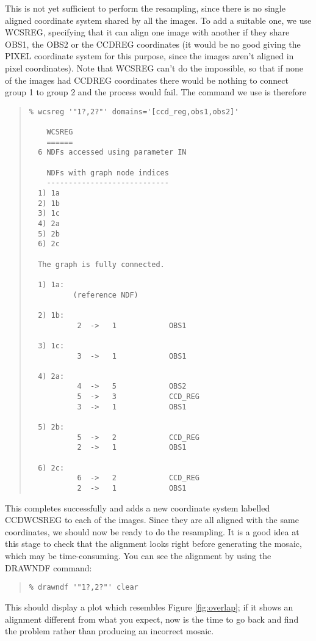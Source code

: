 \documentclass[twoside,11pt]{article}
\newcommand{\hyperref}[4]{#2\ref{#4}#3}
\newcommand{\htmlref}[2]{#1}
\renewcommand{\_}{\texttt{\symbol{95}}}
\newenvironment{myquote}{\begin{quote}\begin{small}}{\end{small}\end{quote}}
\newcommand{\routine}[1]{{\sc #1}}
\newcommand{\xroutine}[1]{\htmlref{{\sc #1}}{#1}}
\begin{document}
This is not yet sufficient to perform the resampling,
since there is no single aligned coordinate system shared by all the images.
To add a suitable one, we use \xroutine{WCSREG},
specifying that it can align one image with another if they share
OBS1, the OBS2 or the CCD\_REG coordinates (it would be no good
giving the PIXEL coordinate system for this purpose, since the images aren't
aligned in pixel coordinates).
Note that \routine{WCSREG} can't do the impossible, so that if
none of the images had CCD\_REG coordinates there would be nothing
to connect group 1 to group 2 and the process would fail.
The command we use is therefore
\begin{myquote}
\begin{verbatim}
% wcsreg '"1?,2?"' domains='[ccd_reg,obs1,obs2]'

    WCSREG
    ======
  6 NDFs accessed using parameter IN

    NDFs with graph node indices
    ----------------------------
  1) 1a
  2) 1b
  3) 1c
  4) 2a
  5) 2b
  6) 2c

  The graph is fully connected.

  1) 1a:
          (reference NDF)

  2) 1b:
           2  ->   1            OBS1

  3) 1c:
           3  ->   1            OBS1

  4) 2a:
           4  ->   5            OBS2
           5  ->   3            CCD_REG
           3  ->   1            OBS1

  5) 2b:
           5  ->   2            CCD_REG
           2  ->   1            OBS1

  6) 2c:
           6  ->   2            CCD_REG
           2  ->   1            OBS1
\end{verbatim}
\end{myquote}
This completes successfully and adds a new coordinate system
labelled CCD\_WCSREG to each of the images.
Since they are all aligned with the same coordinates, we should now be
ready to do the resampling.
It is a good idea at this stage to check that the alignment looks right
before generating the mosaic, which may be time-consuming.
You can see the alignment by using the \xroutine{DRAWNDF}
command:
\begin{myquote}
\begin{verbatim}
% drawndf '"1?,2?"' clear
\end{verbatim}
\end{myquote}
This should display a plot which resembles 
\hyperref{the above figure}{Figure }{}{fig:overlap};
if it shows an alignment different from what you expect, 
now is the time to go back
and find the problem rather than producing an incorrect mosaic.
\end{document}
